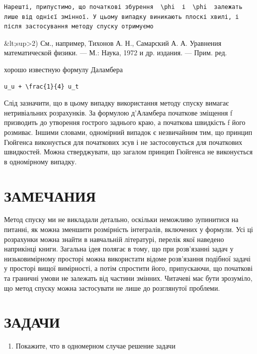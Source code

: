 \documentclass[
  ukrainian,
]{article}
\providecommand{\tightlist}{%
  \setlength{\itemsep}{0pt}\setlength{\parskip}{0pt}}
\begin{document}
\begin{verbatim}
Нарешті, припустимо, що початкові збурення  \phi  і  \phi  залежать лише від однієї змінної. У цьому випадку виникають плоскі хвилі, і після застосування методу спуску отримуємо
\end{verbatim}

\&lt;sup\textgreater2) См., например, Тихонов А. Н., Самарский А. А.
Уравнения математической физики. --- М.: Наука, 1972 и др. издания. ---
Прим. ред.

хорошо известную формулу Даламбера

\begin{verbatim}
u_u + \frac{1}{4} u_t
\end{verbatim}

Слід зазначити, що в цьому випадку використання методу спуску вимагає
нетривіальних розрахунків. За формулою д'Аламбера початкове зміщення f
призводить до утворення гострого заднього краю, а початкова швидкість f
його розмиває. Іншими словами, одномірний випадок є незвичайним тим, що
принцип Гюйгенса виконується для початкових зсув і не застосовується для
початкових швидкостей. Можна стверджувати, що загалом принцип Гюйгенса
не виконується в одномірному випадку.

\section{ЗАМЕЧАНИЯ}\label{ux437ux430ux43cux435ux447ux430ux43dux438ux44f-1}

Метод спуску ми не викладали детально, оскільки неможливо зупинитися на
питанні, як можна зменшити розмірність інтегралів, включених у формули.
Усі ці розрахунки можна знайти в навчальній літературі, перелік якої
наведено наприкінці книги. Загальна ідея полягає в тому, що при
розв'язанні задач у низьковимірному просторі можна використати відоме
розв'язання подібної задачі у просторі вищої вимірності, а потім
спростити його, припускаючи, що початкові та граничні умови не залежать
від частини змінних. Читачеві має бути зрозуміло, що метод спуску можна
застосувати не лише до розглянутої проблеми.

\section{ЗАДАЧИ}\label{ux437ux430ux434ux430ux447ux438-3}

\begin{enumerate}
\def\labelenumi{\arabic{enumi}.}
\tightlist
\item
  Покажите, что в одномерном случае решение задачи
\end{enumerate}
\end{document}
